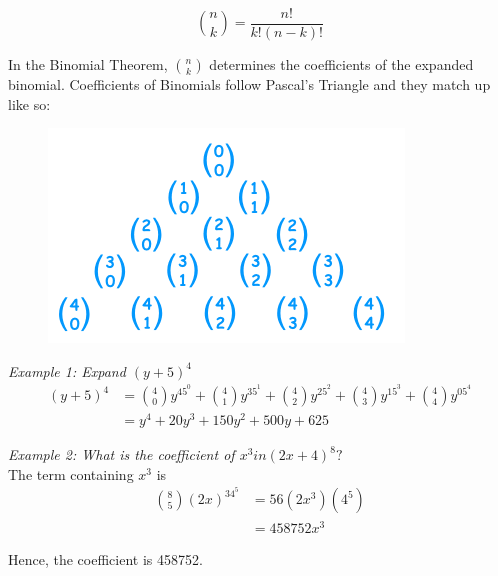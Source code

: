         \begin{equation*}
            \binom{n}{k}=\frac{n!}{k!(n-k)!}
        \end{equation*}

        \noindent In the Binomial Theorem, $\binom{n}{k}$ determines the coefficients of the
        expanded binomial. Coefficients of Binomials follow Pascal's Triangle and they match up
        like so: \\

        \begin{figure} [hbt!]
            \centering
            \includegraphics[scale = 0.5] {Resources/Unit11Sequences/pascal.PNG}
        \end{figure}

        \noindent \color{blue} \textit{Example 1: Expand $(y+5)^4$} \color{black} \\

        \begin{align*}
            (y+5)^4 &= \binom{4}{0}y^45^0
            + \binom{4}{1}y^35^1
            + \binom{4}{2}y^25^2
            + \binom{4}{3}y^15^3
            + \binom{4}{4}y^05^4 \\
            &= y^4+20y^3+150y^2+500y+625
        \end{align*}

        \noindent \color{blue} \textit{Example 2: What is the coefficient of $x^3 in (2x+4)^8?$}
        \color{black} \\
        The term containing $x^3$ is \\

        \begin{align}
            \binom{8}{5}(2x)^34^5 &= 56(2x^3)(4^5) \\
            &= 458752x^3
        \end{align}

        \noindent Hence, the coefficient is 458752.